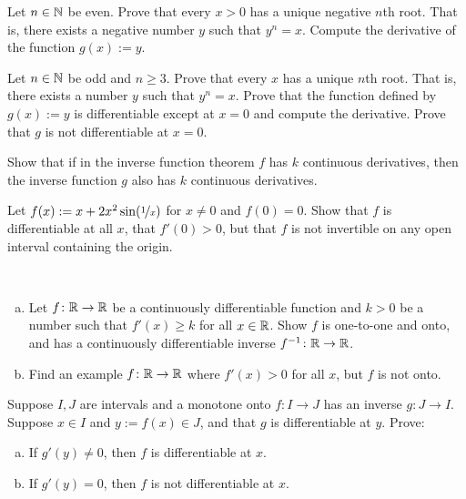 \begin{exercise}
Let $n\in {\mathbb{N}}$ be even.
Prove that every $x > 0$ has a unique negative $n$th root.
That is, there exists a negative number $y$ such that $y^n = x$.
Compute the derivative
of the function $g(x) := y$.
\end{exercise}

\begin{exercise} \label{exercise:oddroot}
Let $n \in {\mathbb{N}}$ be odd and $n \geq 3$.
Prove that every $x$ has a unique $n$th root.
That is, there exists a number $y$ such that $y^n = x$.  Prove that
the function defined by $g(x) := y$ is differentiable except at $x=0$
and compute the derivative.  Prove that $g$ is not differentiable at $x=0$.
\end{exercise}

\begin{exercise}
Show that if in the inverse function theorem $f$ has $k$ continuous
derivatives, then the inverse function $g$ also has $k$ continuous
derivatives.
\end{exercise}

\begin{exercise}
Let $f(x) := x + 2 x^2 \sin(\nicefrac{1}{x})$ for $x \not= 0$ and
$f(0) = 0$.  Show that $f$ is differentiable at all $x$, that $f'(0) > 0$,
but that $f$ is not invertible
on any open interval containing the origin.
\end{exercise}

\begin{exercise}
{\ }
\begin{enumerate}[a)]
\item
Let $f \colon {\mathbb{R}} \to {\mathbb{R}}$ be a continuously differentiable function
and $k > 0$ be a number such that $f'(x) \geq k$ for all $x \in {\mathbb{R}}$.
Show $f$ is one-to-one and onto, and has a continuously differentiable
inverse $f^{-1} \colon {\mathbb{R}} \to {\mathbb{R}}$.
\item
Find an example $f \colon {\mathbb{R}} \to {\mathbb{R}}$
where $f'(x) > 0$
for all $x$, but $f$ is not onto.
\end{enumerate}
\end{exercise}

\begin{exercise}
Suppose $I,J$ are intervals and a monotone onto $f \colon I \to J$ has an inverse $g \colon J \to I$.
Suppose $x \in I$ and $y := f(x) \in J$, and that $g$ is differentiable at
$y$.  Prove:
\begin{enumerate}[a)]
\item
If $g'(y) \not= 0$, then $f$ is differentiable at $x$.
\item
If $g'(y) = 0$, then $f$ is not differentiable at $x$.
\end{enumerate}
\end{exercise}
